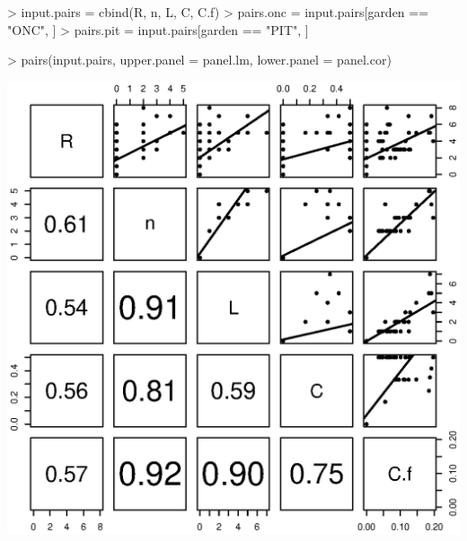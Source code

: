 \documentclass[11pt]{amsart}
\begin{document}









\begin{Schunk}
\begin{Sinput}
> input.pairs = cbind(R, n, L, C, C.f)
> pairs.onc = input.pairs[garden == "ONC", ]
> pairs.pit = input.pairs[garden == "PIT", ]
\end{Sinput}
\end{Schunk}

\begin{Schunk}
\begin{Sinput}
> pairs(input.pairs, upper.panel = panel.lm, lower.panel = panel.cor)
\end{Sinput}
\end{Schunk}
\includegraphics{LCO_analyses-014}
\end{document}
